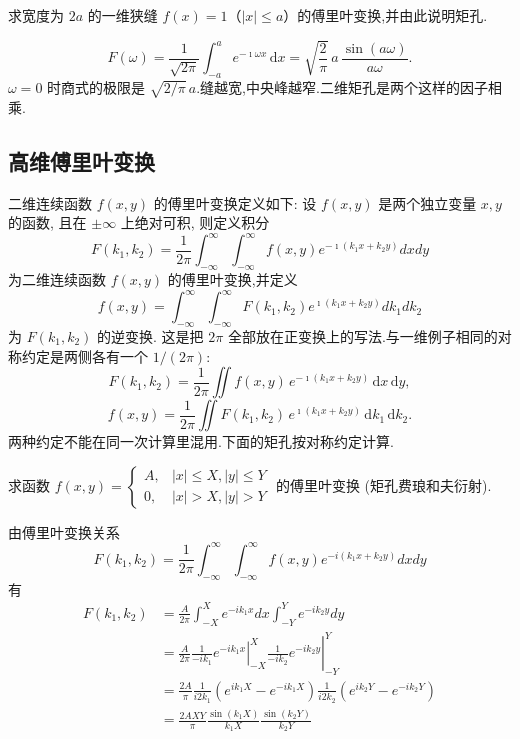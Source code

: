 \begin{example}
求宽度为 $2a$ 的一维狭缝 $f(x)=1$（$|x|\le a$）的傅里叶变换,并由此说明矩孔.
\end{example}
\begin{solution}
\begin{equation}
    F(\omega)
    = \frac{1}{\sqrt{2\pi}}\int_{-a}^{a} e^{-\imath\omega x}\,\mathrm{d}x
    = \sqrt{\frac{2}{\pi}}\, a\, \frac{\sin(a\omega)}{a\omega}.
\end{equation}
$\omega=0$ 时商式的极限是 $\sqrt{2/\pi}\,a$.缝越宽,中央峰越窄.二维矩孔是两个这样的因子相乘.
\end{solution}

\subsection{高维傅里叶变换}

二维连续函数 $f(x, y)$ 的傅里叶变换定义如下:
设 $f(x, y)$ 是两个独立变量 $x, y$ 的函数, 且在 $\pm \infty$ 上绝对可积, 则定义积分
$$
F\left(k_1, k_2\right)=\frac{1}{2 \pi} \int_{-\infty}^{\infty} \int_{-\infty}^{\infty} f(x, y) e^{-\imath\left(k_1 x+k_2 y\right)} d x d y
$$
为二维连续函数 $f(x, y)$ 的傅里叶变换,并定义
$$
f(x, y)=\int_{-\infty}^{\infty} \int_{-\infty}^{\infty} F\left(k_1, k_2\right) e^{\imath\left(k_1 x+k_2 y\right)} d k_1 d k_2
$$
为 $F\left(k_1, k_2\right)$ 的逆变换.
这是把 $2\pi$ 全部放在正变换上的写法.与一维例子相同的对称约定是两侧各有一个 $1/(2\pi)$:
\begin{equation}
    F(k_1,k_2)=\frac{1}{2\pi}\iint f(x,y)\,e^{-\imath(k_1 x+k_2 y)}\,\mathrm{d}x\,\mathrm{d}y,
\end{equation}
\begin{equation}
    f(x,y)=\frac{1}{2\pi}\iint F(k_1,k_2)\,e^{\imath(k_1 x+k_2 y)}\,\mathrm{d}k_1\,\mathrm{d}k_2.
\end{equation}
两种约定不能在同一次计算里混用.下面的矩孔按对称约定计算.

\begin{example}
    求函数 $f(x, y)= \begin{cases}A, & |x| \leq X,|y| \leq Y \\ 0, & |x|>X,|y|>Y\end{cases}$ 的傅里叶变换 (矩孔费琅和夫衍射).
\end{example}
\begin{solution}
    由傅里叶变换关系
$$
F\left(k_1, k_2\right)=\frac{1}{2 \pi} \int_{-\infty}^{\infty} \int_{-\infty}^{\infty} f(x, y) e^{-i\left(k_1 x+k_2 y\right)} d x d y
$$
有
$$
\begin{aligned}
F\left(k_1, k_2\right) & =\frac{A}{2 \pi} \int_{-X}^X e^{-i k_1 x} d x \int_{-Y}^Y e^{-i k_2 y} d y \\
& =\left.\left.\frac{A}{2 \pi} \frac{1}{-i k_1} e^{-i k_1 x}\right|_{-X} ^X \frac{1}{-i k_2} e^{-i k_2 y}\right|_{-Y} ^Y \\
& =\frac{2A}{\pi} \frac{1}{i 2 k_1}\left(e^{i k_1 X}-e^{-i k_1 X}\right) \frac{1}{i 2 k_2}\left(e^{i k_2 Y}-e^{-i k_2 Y}\right) \\
& =\frac{2A X Y}{\pi} \frac{\sin \left(k_1 X\right)}{k_1 X} \frac{\sin \left(k_2 Y\right)}{k_2 Y}
\end{aligned}
$$
\end{solution}


